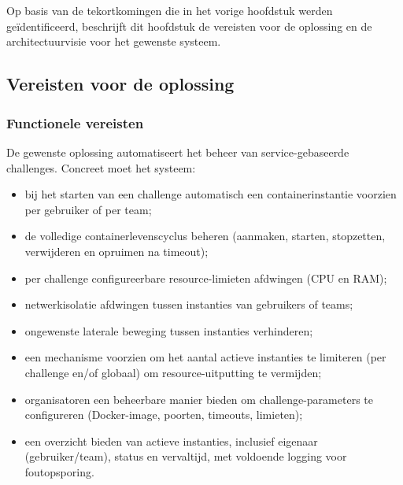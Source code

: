 
\chapter{}%
\label{ch:gewenste-situatie}

Op basis van de tekortkomingen die in het vorige hoofdstuk werden geïdentificeerd, beschrijft dit hoofdstuk de vereisten voor de oplossing en de architectuurvisie voor het gewenste systeem.

\section{Vereisten voor de oplossing}%
\label{sec:tobe-vereisten}

\subsection{Functionele vereisten}

De gewenste oplossing automatiseert het beheer van service-gebaseerde challenges. Concreet moet het systeem:

\begin{itemize}
  \item bij het starten van een challenge automatisch een containerinstantie voorzien per gebruiker of per team;
  \item de volledige containerlevenscyclus beheren (aanmaken, starten, stopzetten, verwijderen en opruimen na timeout);
  \item per challenge configureerbare resource-limieten afdwingen (CPU en RAM);
  \item netwerkisolatie afdwingen tussen instanties van gebruikers of teams;
  \item ongewenste laterale beweging tussen instanties verhinderen;
  \item een mechanisme voorzien om het aantal actieve instanties te limiteren (per challenge en/of globaal) om resource-uitputting te vermijden;
  \item organisatoren een beheerbare manier bieden om challenge-parameters te configureren (Docker-image, poorten, timeouts, limieten);
  \item een overzicht bieden van actieve instanties, inclusief eigenaar (gebruiker/team), status en vervaltijd, met voldoende logging voor foutopsporing.
\end{itemize}

